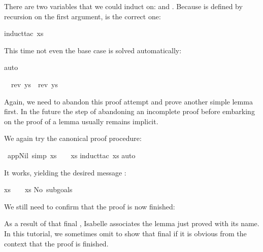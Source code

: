 \begin{isabellebody}
\begin{isamarkuptxt}
There are two variables that we could induct on:  and
. Because \isa{{\isacharat}} is defined by recursion on
the first argument,  is the correct one:%
\end{isamarkuptxt}%
\isamarkuptrue%
\isamarkupfalse%
{\isacharparenleft}induct{\isacharunderscore}tac\ xs{\isacharparenright}%
\begin{isamarkuptxt}%
\noindent
This time not even the base case is solved automatically:%
\end{isamarkuptxt}%
\isamarkuptrue%
\isamarkupfalse%
{\isacharparenleft}auto{\isacharparenright}%
\begin{isamarkuptxt}%
\begin{isabelle}%
\ {}{\isachardot}\ rev\ ys\ {\isacharequal}\ rev\ ys\ {\isacharat}\ {\isacharbrackleft}{\isacharbrackright}%
\end{isabelle}
Again, we need to abandon this proof attempt and prove another simple lemma
first. In the future the step of abandoning an incomplete proof before
embarking on the proof of a lemma usually remains implicit.%
\end{isamarkuptxt}%
\isamarkuptrue%
%
\endisatagproof
{\isafoldproof}%
%
\isadelimproof
%
\endisadelimproof
%
\isamarkuptrue%
%
\begin{isamarkuptext}%
We again try the canonical proof procedure:%
\end{isamarkuptext}%
\isamarkuptrue%
\isamarkupfalse%
\ app{\isacharunderscore}Nil{}\ {\isacharbrackleft}simp{\isacharbrackright}{\isacharcolon}\ {\isachardoublequoteopen}xs\ {\isacharat}\ {\isacharbrackleft}{\isacharbrackright}\ {\isacharequal}\ xs{\isachardoublequoteclose}\isanewline
%
\isadelimproof
%
\endisadelimproof
%
\isatagproof
{}\isamarkupfalse%
{\isacharparenleft}induct{\isacharunderscore}tac\ xs{\isacharparenright}\isanewline
{}\isamarkupfalse%
{\isacharparenleft}auto{\isacharparenright}%
\begin{isamarkuptxt}%
\noindent
It works, yielding the desired message :
\begin{isabelle}%
xs\ {\isacharat}\ {\isacharbrackleft}{\isacharbrackright}\ {\isacharequal}\ xs\isanewline
No\ subgoals{\isacharbang}%
\end{isabelle}
We still need to confirm that the proof is now finished:%
\end{isamarkuptxt}%
\isamarkuptrue%
\isamarkupfalse%
%
\endisatagproof
{\isafoldproof}%
%
\isadelimproof
%
\endisadelimproof
%
\begin{isamarkuptext}%
\noindent
As a result of that final , Isabelle associates the lemma just proved
with its name. In this tutorial, we sometimes omit to show that final 
if it is obvious from the context that the proof is finished.


\end{isamarkuptext}
\end{isabellebody}
